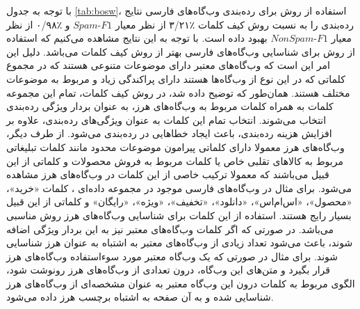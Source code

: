 \documentclass[twoside, a4paper,11pt]{book}
\numberwithin{equation}{chapter}
\numberwithin{table}{chapter}
\numberwithin{figure}{chapter}
\numberwithin{equation}{chapter}
\begin{document}
با توجه به جدول \ref{tab:bosw}، استفاده از روش  برای رده‌بندی وب‌گاه‌های فارسی نتایج رده‌بندی را به نسبت روش کیف کلمات ٪۳/۲۱ از نظر معیار $Spam\text{-}F1$ و ٪۰/۹۸ از نظر معیار $NonSpam\text{-}F1$ بهبود داده‌ است. با توجه به این نتایج مشاهده می‌کنیم که استفاده از روش  برای شناسایی وب‌گاه‌های فارسی بهتر از روش کیف کلمات می‌باشد. دلیل این امر این است که وب‌گاه‌های معتبر دارای موضوعات متنوعی هستند که در مجموع کلماتی که در این نوع از وب‌گاه‌ها هستند دارای پراکندگی زیاد و مربوط به موضوعات مختلف هستند. همان‌طور که توضیح داده شد، در روش کیف کلمات، تمام این مجموعه کلمات به همراه کلمات مربوط به وب‌گاه‌های هرز، به عنوان بردار ویژگی رده‌بندی انتخاب می‌شوند. انتخاب تمام این کلمات به عنوان ویژگی‌های رده‌بندی، علاوه بر افزایش هزینه رده‌بندی، باعث ایجاد خطاهایی در رده‌بندی می‌شود. از طرف دیگر، وب‌گاه‌های هرز معمولا دارای کلماتی پیرامون موضوعات محدود مانند کلمات تبلیغاتی مربوط به کالاهای تقلبی خاص یا کلمات مربوط به فروش محصولات و کلماتی از این قبیل می‌باشند که معمولا ترکیب خاصی از این کلمات در وب‌گاه‌های هرز مشاهده می‌شود. برای مثال در وب‌گاه‌های فارسی موجود در مجموعه داده‌ای ، کلمات «خرید»، «محصول»، «اس‌ام‌اس»، «دانلود»، «تخفیف»، «ویژه»، «رایگان» و کلماتی از این قبیل بسیار رایج هستند. استفاده از این کلمات برای شناسایی وب‌گاه‌های هرز روش مناسبی می‌باشد. در صورتی که اگر کلمات وب‌گاه‌های معتبر نیز به این بردار ویژگی اضافه شوند، باعث می‌شود تعداد زیادی از وب‌گاه‌های معتبر به اشتباه به عنوان هرز شناسایی شوند. برای مثال در صورتی که یک وب‌گاه معتبر مورد سوء‌استفاده وب‌گاه‌های هرز قرار بگیرد و متن‌های این وب‌گاه، درون تعدادی از وب‌گاه‌های هرز رونوشت شود، الگوی مربوط به کلمات درون این وب‌گاه معتبر به عنوان مشخصه‌ای از وب‌گاه‌های هرز شناسایی شده و به آن صفحه به اشتباه برچسب هرز داده می‌شود.
\end{document}
